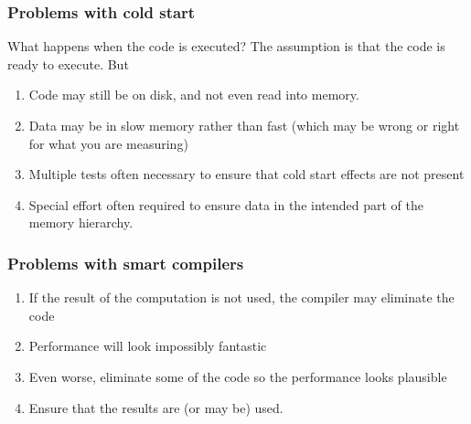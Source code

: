 \documentclass{beamer}
\begin{document}
\begin{frame}
\frametitle{Problems with cold start}

What happens when the code is executed? The assumption is that the code is ready to
execute. But
\begin{enumerate}
\item Code may still be on disk, and not even read into memory.

\item Data may be in slow memory rather than fast (which may be wrong or right for what you are measuring)

\item Multiple tests often necessary to ensure that cold start effects are not present

\item Special effort often required to ensure data in the intended part of the memory hierarchy.
\end{enumerate}

\noindent
\end{frame}

\begin{frame}
\frametitle{Problems with smart compilers}

\begin{enumerate}
\item If the result of the computation is not used, the compiler may eliminate the code

\item Performance will look impossibly fantastic

\item Even worse, eliminate some of the code so the performance looks plausible

\item Ensure that the results are (or may be) used.
\end{enumerate}

\noindent
\end{frame}
\end{document}

